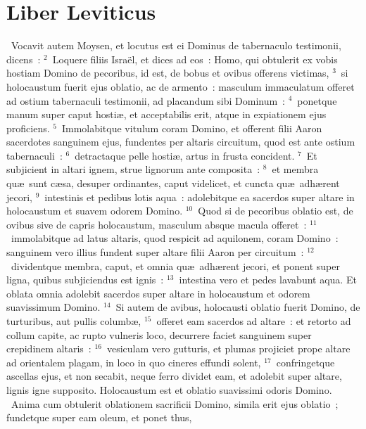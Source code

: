 {\centering \section*{Liber Leviticus}}\thispagestyle{empty}

~Vocavit autem Moysen, et locutus est ei Dominus de tabernaculo testimonii, dicens~:
${}^{2}$~Loquere filiis Isra\"el, et dices ad eos~: Homo, qui obtulerit ex vobis hostiam Domino de pecoribus, id est, de bobus et ovibus offerens victimas,
${}^{3}$~si holocaustum fuerit ejus oblatio, ac de armento~: masculum immaculatum offeret ad ostium tabernaculi testimonii, ad placandum sibi Dominum~:
${}^{4}$~ponetque manum super caput hosti\ae , et acceptabilis erit, atque in expiationem ejus proficiens.
${}^{5}$~Immolabitque vitulum coram Domino, et offerent filii Aaron sacerdotes sanguinem ejus, fundentes per altaris circuitum, quod est ante ostium tabernaculi~:
${}^{6}$~detractaque pelle hosti\ae , artus in frusta concident.
${}^{7}$~Et subjicient in altari ignem, strue lignorum ante composita~:
${}^{8}$~et membra qu\ae\ sunt c\ae sa, desuper ordinantes, caput videlicet, et cuncta qu\ae\ adh\ae rent jecori,
${}^{9}$~intestinis et pedibus lotis aqua~: adolebitque ea sacerdos super altare in holocaustum et suavem odorem Domino.
${}^{10}$~Quod si de pecoribus oblatio est, de ovibus sive de capris holocaustum, masculum absque macula offeret~:
${}^{11}$~immolabitque ad latus altaris, quod respicit ad aquilonem, coram Domino~: sanguinem vero illius fundent super altare filii Aaron per circuitum~:
${}^{12}$~dividentque membra, caput, et omnia qu\ae\ adh\ae rent jecori, et ponent super ligna, quibus subjiciendus est ignis~:
${}^{13}$~intestina vero et pedes lavabunt aqua. Et oblata omnia adolebit sacerdos super altare in holocaustum et odorem suavissimum Domino.
${}^{14}$~Si autem de avibus, holocausti oblatio fuerit Domino, de turturibus, aut pullis columb\ae ,
${}^{15}$~offeret eam sacerdos ad altare~: et retorto ad collum capite, ac rupto vulneris loco, decurrere faciet sanguinem super crepidinem altaris~:
${}^{16}$~vesiculam vero gutturis, et plumas projiciet prope altare ad orientalem plagam, in loco in quo cineres effundi solent,
${}^{17}$~confringetque ascellas ejus, et non secabit, neque ferro dividet eam, et adolebit super altare, lignis igne supposito. Holocaustum est et oblatio suavissimi odoris Domino.
~Anima cum obtulerit oblationem sacrificii Domino, simila erit ejus oblatio~; fundetque super eam oleum, et ponet thus,
